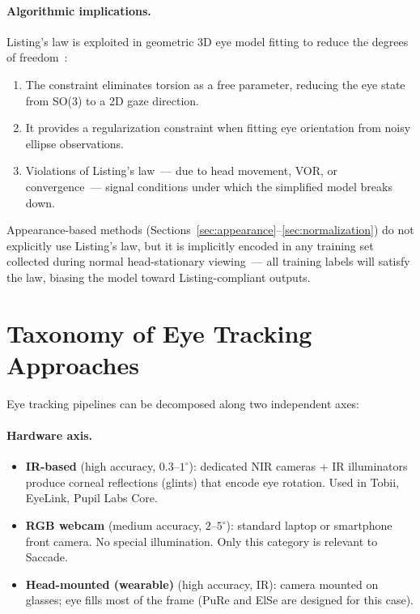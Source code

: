 \documentclass[11pt,a4paper]{article}
\begin{document}
\paragraph{Algorithmic implications.}
Listing's law is exploited in geometric 3D eye model fitting to reduce the degrees of freedom~\cite{swirski2013fully}:
\begin{enumerate}
  \item The constraint eliminates torsion as a free parameter, reducing the eye state from SO(3) to a 2D gaze direction.
  \item It provides a regularization constraint when fitting eye orientation from noisy ellipse observations.
  \item Violations of Listing's law~--- due to head movement, VOR, or convergence~--- signal conditions under which the simplified model breaks down.
\end{enumerate}
Appearance-based methods (Sections~\ref{sec:appearance}--\ref{sec:normalization}) do not explicitly use Listing's law, but it is implicitly encoded in any training set collected during normal head-stationary viewing~--- all training labels will satisfy the law, biasing the model toward Listing-compliant outputs.

\section{Taxonomy of Eye Tracking Approaches}
\label{sec:taxonomy}

Eye tracking pipelines can be decomposed along two independent axes:

\paragraph{Hardware axis.}
\begin{itemize}
  \item \textbf{IR-based} (high accuracy, $0.3$--$1^\circ$): dedicated NIR cameras + IR illuminators produce corneal reflections (glints) that encode eye rotation. Used in Tobii, EyeLink, Pupil Labs Core.
  \item \textbf{RGB webcam} (medium accuracy, $2$--$5^\circ$): standard laptop or smartphone front camera. No special illumination. Only this category is relevant to Saccade.
  \item \textbf{Head-mounted (wearable)} (high accuracy, IR): camera mounted on glasses; eye fills most of the frame (PuRe and ElSe are designed for this case).
\end{itemize}
\end{document}
